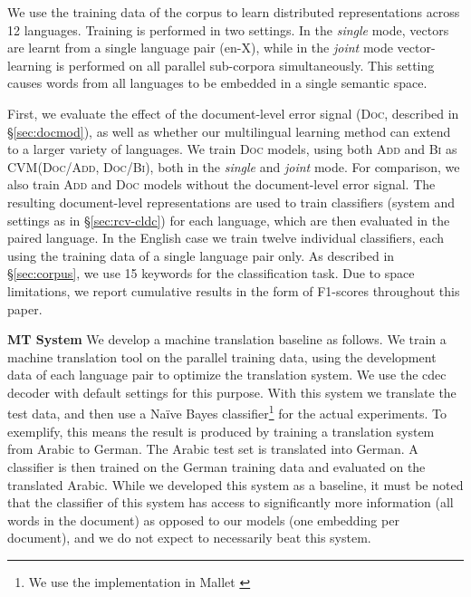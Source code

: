 \documentclass[11pt]{article}
\newcommand{\addMod}{\textsc{Add}\xspace}
\newcommand{\flatMod}{\textsc{Bi}\xspace}
\newcommand{\docMod}{\textsc{Doc}\xspace}
\newcommand{\docModadd}{\textsc{Doc/Add}\xspace}
\newcommand{\docModflat}{\textsc{Doc/Bi}\xspace}
\newcommand{\CVM}{\textsc{CVM}\xspace}
\newcommand{\single}{\textit{single}\xspace}
\newcommand{\joint}{\textit{joint}\xspace}
\begin{document}
We use the training data of the corpus to learn distributed representations
across 12 languages. Training is performed in two settings. In the \single
mode, vectors are learnt from a single language pair (en-X), while in the \joint
mode vector-learning is performed on all parallel sub-corpora simultaneously.
This setting causes words from all languages to be embedded in a single semantic
space.

First, we evaluate the effect of the document-level error signal (\docMod,
  described in \S\ref{sec:docmod}), as well as whether our multilingual learning
method can extend to a larger variety of languages. We train \docMod models,
using both \addMod and \flatMod as \CVM (\docModadd, \docModflat), both in the
\single and \joint mode. For comparison, we also train \addMod and \docMod
models without the document-level error signal.  The resulting document-level
representations are used to train classifiers (system and settings as in
  \S\ref{sec:rcv-cldc}) for each language, which are then evaluated in the
paired language. In the English case we train twelve individual classifiers,
each using the training data of a single language pair only.  As described in
\S\ref{sec:corpus}, we use 15 keywords for the classification task.  Due to
space limitations, we report cumulative results in the form of F1-scores
throughout this paper.

\vspace{0.05in}
\noindent\textbf{MT System}\hspace{0.1in}
We develop a machine translation baseline as follows.  We train a
machine translation tool on the parallel training data, using the development
data of each language pair to optimize the translation system.  We use the cdec
decoder \cite{Dyer:2010} with default settings for this purpose.  With this
system we translate the test data, and then use a Na\"{i}ve Bayes
classifier\footnote{We use the implementation in Mallet \cite{McCallum:2002}}
for the actual experiments.  To exemplify, this means the  result is
produced by training a translation system from Arabic to German. The Arabic
test set is translated into German. A classifier is then trained on the German
training data and evaluated on the translated Arabic. While we developed this
system as a baseline, it must be noted that the classifier of this system has
access to significantly more information (all words in the document) as opposed
to our models (one embedding per document), and we do not expect to necessarily
beat this system.
\end{document}

